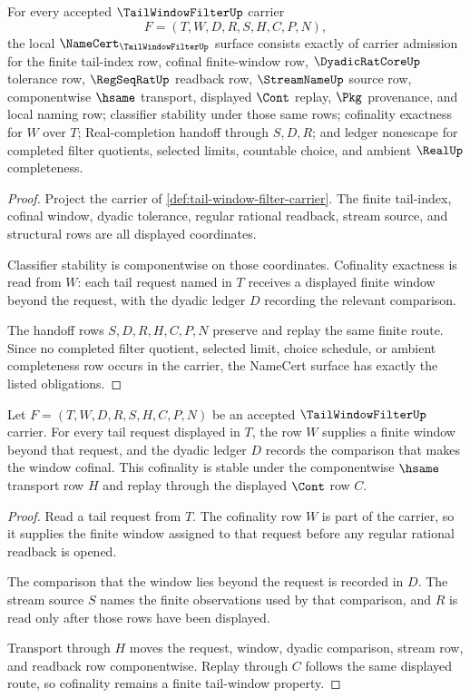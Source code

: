 \begin{theorem}
\label{thm:tail-window-filter-namecert-obligations}
For every accepted $\TailWindowFilterUp$ carrier
$$
F=(T,W,D,R,S,H,C,P,N),
$$
the local $\NameCert_{\TailWindowFilterUp}$ surface consists exactly of carrier admission for the finite tail-index row, cofinal finite-window row, $\DyadicRatCoreUp$ tolerance row, $\RegSeqRatUp$ readback row, $\StreamNameUp$ source row, componentwise $\hsame$ transport, displayed $\Cont$ replay, $\Pkg$ provenance, and local naming row; classifier stability under those same rows; cofinality exactness for $W$ over $T$; Real-completion handoff through $S,D,R$; and ledger nonescape for completed filter quotients, selected limits, countable choice, and ambient $\RealUp$ completeness.
\end{theorem}
\begin{proof}
Project the carrier of \autoref{def:tail-window-filter-carrier}. The finite tail-index, cofinal window, dyadic tolerance, regular rational readback, stream source, and structural rows are all displayed coordinates.

Classifier stability is componentwise on those coordinates. Cofinality exactness is read from $W$: each tail request named in $T$ receives a displayed finite window beyond the request, with the dyadic ledger $D$ recording the relevant comparison.

The handoff rows $S,D,R,H,C,P,N$ preserve and replay the same finite route. Since no completed filter quotient, selected limit, choice schedule, or ambient completeness row occurs in the carrier, the NameCert surface has exactly the listed obligations.
\end{proof}

\begin{theorem}
\label{thm:tail-window-filter-cofinality}
Let $F=(T,W,D,R,S,H,C,P,N)$ be an accepted $\TailWindowFilterUp$ carrier. For every tail request displayed in $T$, the row $W$ supplies a finite window beyond that request, and the dyadic ledger $D$ records the comparison that makes the window cofinal. This cofinality is stable under the componentwise $\hsame$ transport row $H$ and replay through the displayed $\Cont$ row $C$.
\end{theorem}
\begin{proof}
Read a tail request from $T$. The cofinality row $W$ is part of the carrier, so it supplies the finite window assigned to that request before any regular rational readback is opened.

The comparison that the window lies beyond the request is recorded in $D$. The stream source $S$ names the finite observations used by that comparison, and $R$ is read only after those rows have been displayed.

Transport through $H$ moves the request, window, dyadic comparison, stream row, and readback row componentwise. Replay through $C$ follows the same displayed route, so cofinality remains a finite tail-window property.
\end{proof}

